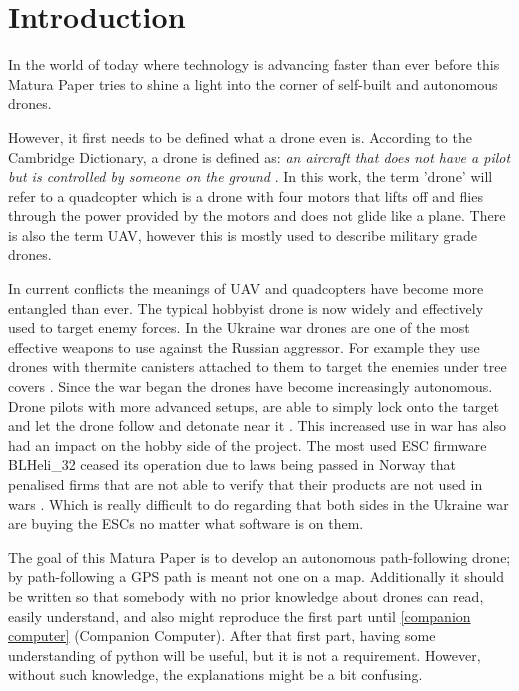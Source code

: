 \documentclass[svgnames]{article}
\begin{document}
\maketitle
\tableofcontents
\pagebreak
	\section{Introduction}
	
	In the world of today where technology is advancing faster than ever before this Matura Paper tries to shine a light into the corner of self-built and autonomous drones.
	
	However, it first needs to be defined what a drone even is. According to the Cambridge Dictionary, a drone is defined as: \textit{an aircraft that does not have a pilot but is controlled by someone on the ground} \cite{cambridgedrone}. In this work, the term 'drone' will refer to a quadcopter which is a drone with four motors that lifts off and flies through the power provided by the motors and does not glide like a plane. There is also the term \gls{UAV}, however this is mostly used to describe military grade drones.

	In current conflicts the meanings of \gls{UAV} and quadcopters have become more entangled than ever. The typical hobbyist drone is now widely and effectively used to target enemy forces. In the Ukraine war drones are one of the most effective weapons to use against the Russian aggressor. For example they use drones with thermite canisters attached to them to target the enemies under tree covers \cite{thermitedrones}. Since the war began the drones have become increasingly autonomous. Drone pilots with more advanced setups, are able to simply lock onto the target and let the drone follow and detonate near it \cite{nytimesaidrones}. This increased use in war has also had an impact on the hobby side of the project. The most used \gls{ESC} firmware BLHeli\_32 ceased its operation due to laws being passed in Norway that penalised firms that are not able to verify that their products are not used in wars \cite{blhelidead}. Which is really difficult to do regarding that both sides in the Ukraine war are buying the \glspl{ESC} no matter what software is on them.  
	
	The goal of this Matura Paper is to develop an autonomous path-following drone; by path-following a \gls{GPS} path is meant not one on a map. Additionally it should be written so that somebody with no prior knowledge about drones can read, easily understand, and also might reproduce the first part until \cref{companion computer} (Companion Computer). After that first part, having some understanding of python will be useful, but it is not a requirement. However, without such knowledge, the explanations might be a bit confusing.
	
\end{document}
